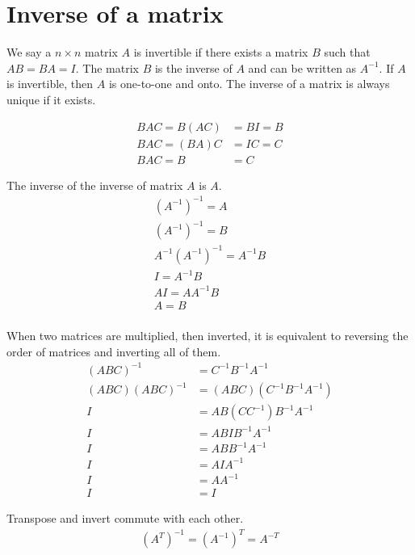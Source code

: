 \documentclass{article}
\theoremstyle{mytheoremstyle}
\theoremstyle{mytheoremstyle}
\theoremstyle{myproblemstyle}
\begin{document}
    \section*{Inverse of a matrix}
    We say a $n\times n$ matrix $A$ is invertible if there exists a matrix $B$
    such that $AB=BA=I$. The matrix $B$ is the inverse of $A$ and can be written
    as $A^{-1}$. If $A$ is invertible, then $A$ is one-to-one and onto. The
    inverse of a matrix is always unique if it exists.

    \begin{align*}
        BAC = B(AC) &= BI = B \\
        BAC = (BA)C &= IC = C \\
        BAC = B &= C
    \end{align*}

    The inverse of the inverse of matrix $A$ is $A$.
    \begin{align*}
        (A^{-1})^{-1} = A \\
        (A^{-1})^{-1} = B \\
        A^{-1}(A^{-1})^{-1} = A^{-1}B \\
        I = A^{-1}B \\
        AI = AA^{-1}B \\
        A = B \\
    \end{align*}

    When two matrices are multiplied, then inverted, it is equivalent to
    reversing the order of matrices and inverting all of them.
    \begin{align*}
        (ABC)^{-1} &= C^{-1}B^{-1}A^{-1} \\
        (ABC)(ABC)^{-1} &= (ABC)(C^{-1}B^{-1}A^{-1}) \\
        I &= AB(CC^{-1})B^{-1}A^{-1} \\
        I &= ABIB^{-1}A^{-1} \\
        I &= ABB^{-1}A^{-1} \\
        I &= AIA^{-1} \\
        I &= AA^{-1} \\
        I &= I
    \end{align*}

    Transpose and invert commute with each other.
    \begin{align*}
        (A^T)^{-1} = (A^{-1})^T = A^{-T}
    \end{align*}
\end{document}
